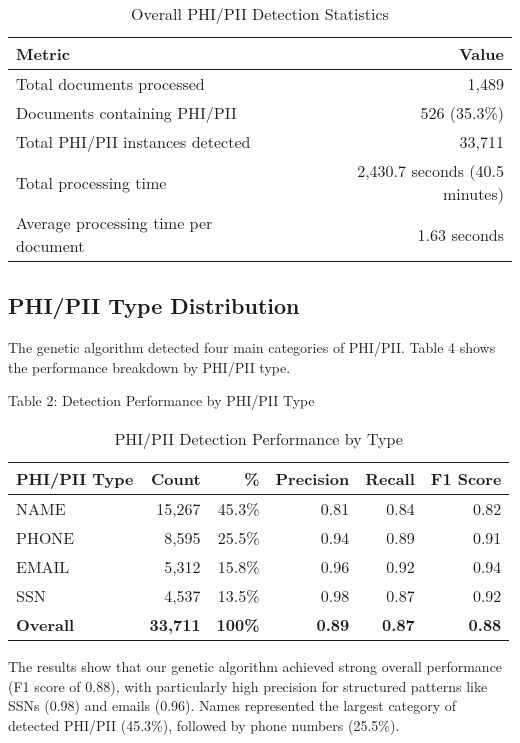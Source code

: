 \documentclass[conference]{IEEEtran}
\begin{document}
\begin{table}[htbp]
\caption{Overall PHI/PII Detection Statistics}
\centering
\renewcommand{\arraystretch}{2.5}
\begin{tabular}{|l|r|}
\hline
\textbf{Metric} & \textbf{Value} \\
\hline
Total documents processed & 1,489 \\
Documents containing PHI/PII & 526 (35.3\%) \\
Total PHI/PII instances detected & 33,711 \\
Total processing time & 2,430.7 seconds (40.5 minutes) \\
Average processing time per document & 1.63 seconds \\
\hline
\end{tabular}
\label{tab:overall-stats}
\end{table}

\subsection{\textbf{PHI/PII Type Distribution}}
The genetic algorithm detected four main categories of PHI/PII. Table 4 shows the performance breakdown by PHI/PII type.

Table 2: Detection Performance by PHI/PII Type

\begin{table}[htbp]
\caption{PHI/PII Detection Performance by Type}
\centering
\renewcommand{\arraystretch}{2.5}
\begin{tabular}{|l|r|r|r|r|r|}
\hline
\textbf{PHI/PII Type} & \textbf{Count} & \textbf{\%} & \textbf{Precision} & \textbf{Recall} & \textbf{F1 Score} \\
\hline
NAME & 15,267 & 45.3\% & 0.81 & 0.84 & 0.82 \\
PHONE & 8,595 & 25.5\% & 0.94 & 0.89 & 0.91 \\
EMAIL & 5,312 & 15.8\% & 0.96 & 0.92 & 0.94 \\
SSN & 4,537 & 13.5\% & 0.98 & 0.87 & 0.92 \\
\textbf{Overall} & \textbf{33,711} & \textbf{100\%} & \textbf{0.89} & \textbf{0.87} & \textbf{0.88} \\
\hline
\end{tabular}
\label{tab:phi-pii-performance}
\end{table}

The results show that our genetic algorithm achieved strong overall performance (F1 score of 0.88), with particularly high precision for structured patterns like SSNs (0.98) and emails (0.96). Names represented the largest category of detected PHI/PII (45.3\%), followed by phone numbers (25.5\%).
\end{document}
